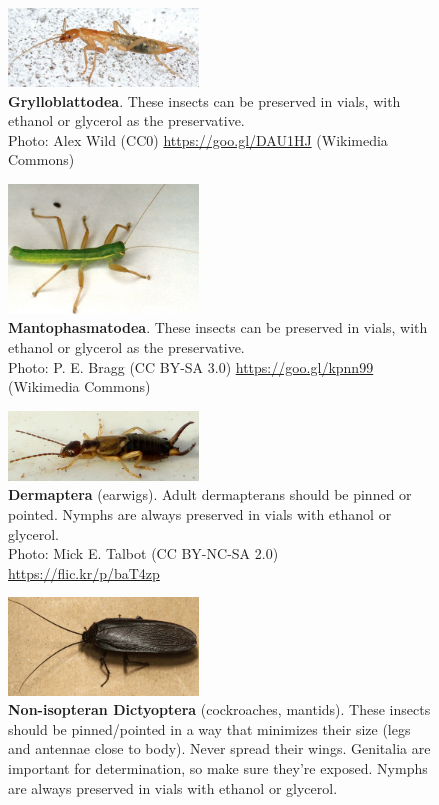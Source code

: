 \documentclass[letterpaper, 11pt]{article}
\begin{document}
\begin{figure}
  \caption{\textbf{Grylloblattodea}. These insects can be preserved in vials, with ethanol or glycerol as the preservative.\\ Photo: Alex Wild (CC0) \url{https://goo.gl/DAU1HJ} (Wikimedia Commons)}
  \includegraphics[width=0.45\textwidth]{Grylloblattodea}
\end{figure}

\clearpage

\begin{figure}
  \caption{\textbf{Mantophasmatodea}. These insects can be preserved in vials, with ethanol or glycerol as the preservative.\\ Photo: P. E. Bragg (CC BY-SA 3.0) \url{https://goo.gl/kpnn99} (Wikimedia Commons)}
  \includegraphics[width=0.45\textwidth]{Mantophasmatodea}
\end{figure}

\begin{figure}
  \caption{\textbf{Dermaptera} (earwigs). Adult dermapterans should be pinned or pointed. Nymphs are always preserved in vials with ethanol or glycerol.\\ Photo: Mick E. Talbot (CC BY-NC-SA 2.0) \url{https://flic.kr/p/baT4zp}}
  \includegraphics[width=0.45\textwidth]{Dermaptera}
\end{figure}

\begin{figure}
  \caption{\textbf{Non-isopteran Dictyoptera} (cockroaches, mantids). These insects should be pinned/pointed in a way that minimizes their size (legs and antennae close to body). Never spread their wings. Genitalia are important for determination, so make sure they’re exposed. Nymphs are always preserved in vials with ethanol or glycerol.}
  \includegraphics[width=0.45\textwidth]{Blattodea}
\end{figure}
\end{document}
